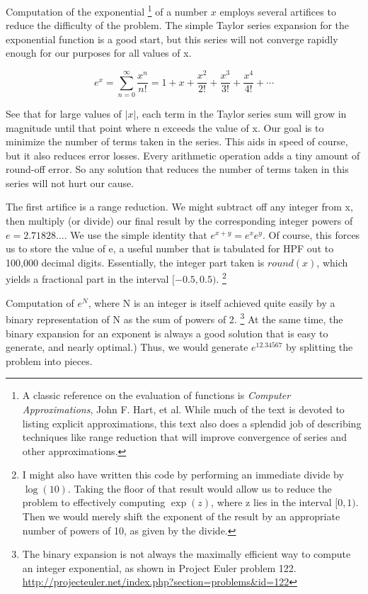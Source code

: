 \documentclass[a4paper,12pt]{article}
\begin{document}
Computation of the exponential \footnote{A classic reference on the evaluation of functions is \emph{Computer Approximations}, John F. Hart, et al. While much of the text is devoted to listing explicit approximations, this text also does a splendid job of describing techniques like range reduction that will improve convergence of series and other approximations.} of a number $x$ employs several artifices to reduce the difficulty of the problem. The simple Taylor series expansion for the exponential function is a good start, but this series will not converge rapidly enough for our purposes for all values of x.

\begin{equation}
    e^x = \sum_{n = 0}^{\infty}{\frac{x^n}{n!}} = 1 + x + \frac{x^2}{2!} + \frac{x^3}{3!} + \frac{x^4}{4!} + \cdots
\end{equation}

See that for large values of $|x|$, each term in the Taylor series sum will grow in magnitude until that point where n exceeds the value of x. Our goal is to minimize the number of terms taken in the series. This aids in speed of course, but it also reduces error losses. Every arithmetic operation adds a tiny amount of round-off error. So any solution that reduces the number of terms taken in this series will not hurt our cause.

The first artifice is a range reduction. We might subtract off any integer from x, then multiply (or divide) our final result by the corresponding integer powers of $e = 2.71828\ldots$. We use the simple identity that $e^{x+y} = e^xe^y$. Of course, this forces us to store the value of e, a useful number that is tabulated for HPF out to 100,000 decimal digits. Essentially, the integer part taken is $round(x)$, which yields a fractional part in the interval $[-0.5,0.5)$. \footnote{I might also have written this code by performing an immediate divide by $\log(10)$. Taking the floor of that result would allow us to reduce the problem to effectively computing $\exp(z)$, where z lies in the interval $[0,1)$. Then we would merely shift the exponent of the result by an appropriate number of powers of 10, as given by the divide.}

Computation of $e^N$, where N is an integer is itself achieved quite easily by a binary representation of N as the sum of powers of 2. \footnote{The binary expansion is not always the maximally efficient way to compute an integer exponential, as shown in Project Euler problem 122. \url{http://projecteuler.net/index.php?section=problems&id=122}} At the same time, the binary expansion for an exponent is always a good solution that is easy to generate, and nearly optimal.) Thus, we would generate $e^{12.34567}$ by splitting the problem into pieces.
\end{document}
